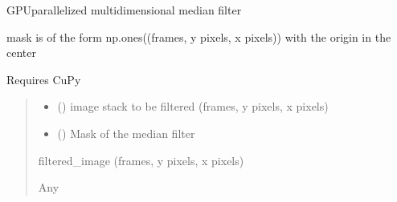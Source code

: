 \documentclass[letterpaper,10pt,english]{sphinxmanual}
\begin{document}
\begin{fulllineitems}
\label{\detokenize{CalSciPy.image_processing:CalSciPy.image_processing.fast_filter_images}}
\pysigstartsignatures
{}
\pysigstopsignatures
\sphinxAtStartPar
GPU\sphinxhyphen{}parallelized multidimensional median filter

\sphinxAtStartPar
mask is of the form np.ones((frames, y pixels, x pixels)) with the origin in the center

\sphinxAtStartPar
Requires CuPy
\begin{quote}\begin{description}
\begin{itemize}
\item {} 
\sphinxAtStartPar
{} () \sphinxhyphen{}\sphinxhyphen{} image stack to be filtered (frames, y pixels, x pixels)

\item {} 
\sphinxAtStartPar
{} (\sphinxstyleliteralemphasis{\sphinxupquote{(}}\sphinxstyleliteralemphasis{\sphinxupquote{(}}\sphinxstyleliteralemphasis{\sphinxupquote{, }}\sphinxstyleliteralemphasis{\sphinxupquote{, }}\sphinxstyleliteralemphasis{\sphinxupquote{)}}\sphinxstyleliteralemphasis{\sphinxupquote{)}}) \sphinxhyphen{}\sphinxhyphen{} Mask of the median filter

\end{itemize}

\sphinxAtStartPar
filtered\_image (frames, y pixels, x pixels)

\sphinxAtStartPar
Any

\end{description}\end{quote}

\end{fulllineitems}
\end{document}
